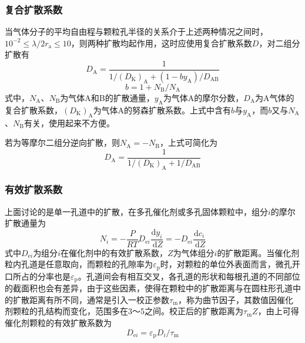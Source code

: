\documentclass[dvipsnames, svgnames, x11names]{beamer}
\begin{document}
\begin{frame}
    \frametitle{复合扩散系数}

    当气体分子的平均自由程与颗粒孔半径的关系介于上述两种情况之间时，$10^{-2} \leqslant \lambda /2r_\mathrm{a} \leqslant 10$，则两种扩散均起作用，这时应使用复合扩散系数$D$，对二组分扩散有
    \[
        D_{\mathrm{A}}=\frac{1}{1 /(D_{\mathrm{K}})_{\mathrm{A}}+(1-b y_{\mathrm{A}}) / D_{\mathrm{AB}}}
    \]
    \vspace{-10 pt}    
    \[
        b=1+N_{\mathrm{B}} / N_{\mathrm{A}}
    \]
    式中，$N_{\mathrm{A}}$、$N_{\mathrm{B}}$为气体A和B的扩散通量，$y_{\mathrm{A}}$为气体A的摩尔分数，$D_{\mathrm{A}}$为A气体的复合扩散系数，$(D_{\mathrm{K}})_{\mathrm{A}}$为气体A的努森扩散系数。上式中含有$b$与$y_{\mathrm{A}}$，而$b$又与$N_{\mathrm{A}}$、$N_{\mathrm{B}}$有关，使用起来不方便。
    
    若为等摩尔二组分逆向扩散，则$N_{\mathrm{A}} = -N_{\mathrm{B}}$，上式可简化为
    \[
        D_{\mathrm{A}}=\frac{1}{1 /(D_{\mathrm{K}})_{\mathrm{A}}+1 / {D}_{\mathrm{AB}}}
    \]

\end{frame}


\begin{frame}
    \frametitle{有效扩散系数}

    上面讨论的是单一孔道中的扩散，在多孔催化剂或多孔固体颗粒中，组分$i$的摩尔扩散通量为
    \[
        N_{i}=-\frac{P}{R T} D_{\mathrm{e} i} \frac{\mathrm{d} y_{i}}{\mathrm{~d} Z}=-D_{\mathrm{e} i} \frac{\mathrm{d} c_{i}}{\mathrm{~d} Z} 
    \]
    式中$D_{\mathrm{e} i}$为组分$i$在催化剂中的有效扩散系数，$Z$为气体组分$i$的扩散距离。当催化剂粒内孔道是任意取向，而颗粒的孔隙率为$\varepsilon_{\mathrm{p}}$时，对颗粒的单位外表面而言，微孔开口所占的分率也是$\varepsilon_{\mathrm{p}}$。孔道间会有相互交叉，各孔道的形状和每根孔道的不同部位的截面积也会有差异，由于这些因素，使得在颗粒中的扩散距离与在圆柱形孔道中的扩散距离有所不同，通常是引入一校正参数$\tau_{\mathrm{m}}$，称为曲节因子，其数值因催化剂颗粒的孔结构而变化，范围多在3～5之间。校正后的扩散距离为$\tau_{\mathrm{m}}Z$，由上可得催化剂颗粒的有效扩散系数为
    \[
        D_{\mathrm{e} i}=\varepsilon_{\mathrm{p}} D_{i} / \tau_{\mathrm{m}}
    \]

\end{frame}
\end{document}

